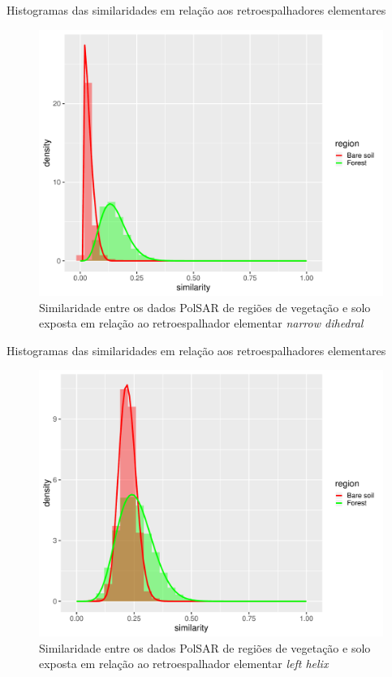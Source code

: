 \documentclass{beamer} %
\begin{document}
\begin{frame}{Histogramas das similaridades em relação aos retroespalhadores elementares}

\begin{figure}
    \centering
    \includegraphics[width = .6\linewidth]{nd.pdf}
    \caption{Similaridade entre os dados PolSAR de regiões de vegetação e solo exposta em relação ao retroespalhador elementar \textit{narrow dihedral}}
    \label{fig:nd}
\end{figure}
    
\end{frame}

\begin{frame}{Histogramas das similaridades em relação aos retroespalhadores elementares}

\begin{figure}
    \centering
    \includegraphics[width = .6\linewidth]{lh.pdf}
    \caption{Similaridade entre os dados PolSAR de regiões de vegetação e solo exposta em relação ao retroespalhador elementar \textit{left helix}}
    \label{fig:lh}
\end{figure}
    
\end{frame}
\end{document}

